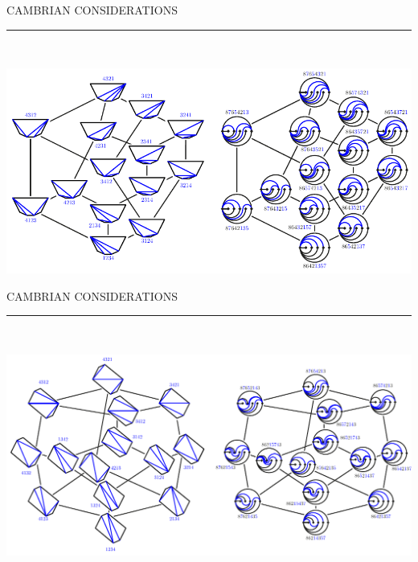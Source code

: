 \documentclass[12pt,titlepage,landscape,a4paper]{article}
\newcommand{\textemoyen}{\fontsize{23}{27}\selectfont}
\newenvironment{slide}[1]
{
\newpage
\begin{center}
{\blue \textemoyen \uppercase{#1}}\\
\end{center}
\vspace{-1cm}
\rule{\textwidth}{0.5 pt}\\
\vspace{-.8cm}
}
{\vspace*{-3cm}}
\newcommand{\blue}{\color{blue}} %
\begin{document}
\begin{slide}{Cambrian considerations}

\vspace{.5cm}
\centerline{\includegraphics[scale=1.6]{wigglyCambrian2}}

\end{slide}


\begin{slide}{Cambrian considerations}

\vspace{.5cm}
\centerline{\includegraphics[scale=1.6]{wigglyCambrian3}}

\end{slide}

\end{document}
